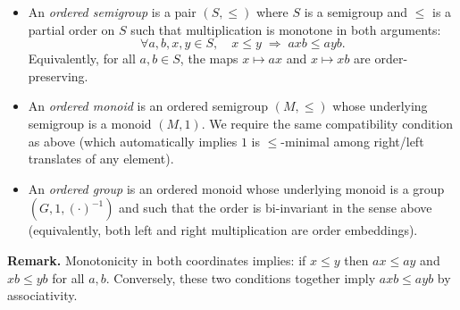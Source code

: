 
\begin{definition}
\label{def:ordered-structures}
\leavevmode
\begin{itemize}
  \item An \emph{ordered semigroup} is a pair \((S,\le)\) where \(S\) is a semigroup and \(\le\) is a partial order on \(S\) such that multiplication is monotone in both arguments:
  \[
    \forall a,b,x,y\in S,\quad x\le y \;\Longrightarrow\; a x b \le a y b.
  \]
  Equivalently, for all \(a,b\in S\), the maps \(x\mapsto a x\) and \(x\mapsto x b\) are order-preserving.
  \item An \emph{ordered monoid} is an ordered semigroup \((M,\le)\) whose underlying semigroup is a monoid \((M,1)\). We require the same compatibility condition as above (which automatically implies \(1\) is \(\le\)-minimal among right/left translates of any element).
  \item An \emph{ordered group} is an ordered monoid whose underlying monoid is a group \((G,1,(\cdot)^{-1})\) and such that the order is bi-invariant in the sense above (equivalently, both left and right multiplication are order embeddings).
\end{itemize}
\end{definition}

\noindent\textbf{Remark.}
Monotonicity in both coordinates implies: if \(x\le y\) then \(a x \le a y\) and \(x b \le y b\) for all \(a,b\). Conversely, these two conditions together imply \(a x b \le a y b\) by associativity.
